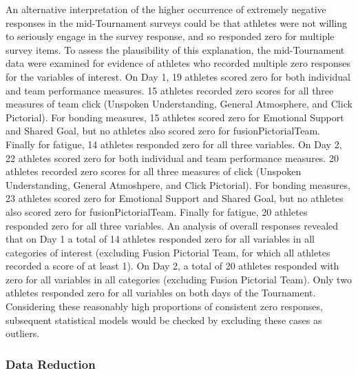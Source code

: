 \documentclass[12pt]{report}
\begin{document}
{An alternative interpretation of the higher occurrence of extremely negative responses in the mid-Tournament surveys could be that athletes were not willing to seriously engage in the survey response, and so responded zero for multiple survey items.  To assess the plausibility of this explanation, the mid-Tournament data were examined for evidence of athletes who recorded multiple zero responses for the variables of interest. On Day 1, 19 athletes scored zero for both individual and team performance measures.  15 athletes recorded zero scores for all three measures of team click (Unspoken Understanding, General Atmosphere, and Click Pictorial). For bonding measures, 15 athletes scored zero for Emotional Support and Shared Goal, but no athletes also scored zero for fusionPictorialTeam.  Finally for fatigue, 14 athletes responded zero for all three variables.  On Day 2, 22 athletes scored zero for both individual and team performance measures.  20 athletes recorded zero scores for all three measures of click (Unspoken Understanding, General Atmoshpere, and Click Pictorial). For bonding measures, 23 athletes scored zero for Emotional Support and Shared Goal, but no athletes also scored zero for fusionPictorialTeam.  Finally for fatigue, 20 athletes responded zero for all three variables.  An analysis of overall responses revealed that on Day 1 a total of 14 athletes responded zero for all variables in all categories of interest (excluding Fusion Pictorial Team, for which all athletes recorded a score of at least 1).  On Day 2, a total of 20 athletes responded with zero for all variables in all categories (excluding Fusion Pictorial Team).  Only two athletes responded zero for all variables on both days of the Tournament.  Considering these reasonably high proportions of consistent zero responses, subsequent statistical models would be checked by excluding these cases as outliers.





\subsubsection{Data Reduction}

}
\end{document}
